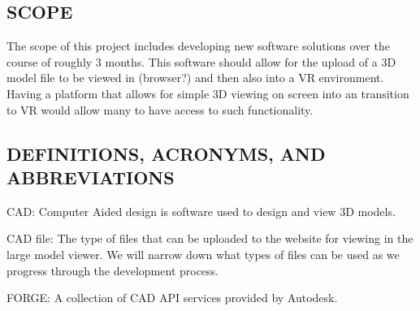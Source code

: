 \documentclass[letterpaper, 10pt, draftclsnofoot, onecolumn]{IEEEtran}
\begin{document}
\begin{comment}
\subsection[PURPOSE]{\selectlanguage{english}\rmfamily\bfseries\color{black}
PURPOSE}
{\selectlanguage{english}\itshape\color{black}
This paragraph shall contain a brief statement on the purpose of the
system and software being developed, and the intended audience for this
document.}

{\selectlanguage{english}\color{black}
The purpose of the system under development is to [ insert your text
here ]. \ While the system will be used by [ insert intended users ],
this document is intended to be read and understood by UICS software
designers and coders. \ [ Optional: The document will also be vetted or
approved by [ insert approval people ]].}
\end{comment}



\subsection[SCOPE]{\rmfamily\bfseries\color{black}
SCOPE}
{\color{black}
The scope of this project includes developing new software solutions over the course of roughly 3 months. This software should allow for the upload of a 3D model file to be viewed in (browser?) and then also into a VR environment. Having a platform that allows for simple 3D viewing on screen into an transition to VR would allow many to have access to such functionality. }

\subsection[DEFINITIONS, ACRONYMS, AND
ABBREVIATIONS]{\rmfamily\bfseries\color{black}
DEFINITIONS, ACRONYMS, AND ABBREVIATIONS}
{\color{black}
	CAD: Computer Aided design is software used to design and view 3D models.
}

{\color{black}
	CAD file: The type of files that can be uploaded to the website for viewing in the large model viewer.
	We will  narrow down what types of files can be used as we progress through the development process.
}

{\color{black}
	FORGE: A collection of CAD API services provided by Autodesk.
}
\end{document}
